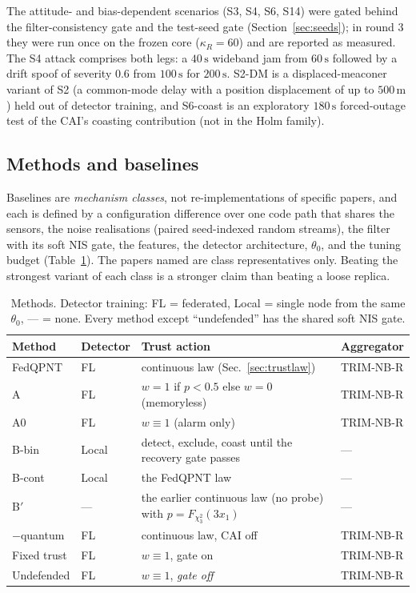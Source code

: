 \documentclass[journal]{IEEEtran}
\begin{document}
The attitude- and bias-dependent scenarios (S3, S4, S6, S14) were gated behind the filter-consistency gate and the
test-seed gate (Section~\ref{sec:seeds}); in round 3 they were run once on the frozen core ($\kappa_R = 60$) and
are reported as measured. The S4 attack comprises both legs: a $40\,\mathrm{s}$ wideband jam from $60\,\mathrm{s}$
followed by a drift spoof of severity $0.6$ from $100\,\mathrm{s}$ for $200\,\mathrm{s}$. S2-DM is a displaced-meaconer variant of S2
(a common-mode delay with a position displacement of up to $500\,\mathrm{m}$) held out of detector training, and S6-coast is an exploratory
$180\,\mathrm{s}$ forced-outage test of the CAI's coasting contribution (not in the Holm family).

\subsection{Methods and baselines}
\label{sec:methods}
Baselines are \emph{mechanism classes}, not re-implementations of specific papers, and each is defined by a
configuration difference over one code path that shares the sensors, the noise realisations (paired
seed-indexed random streams), the filter with its soft NIS gate, the features, the detector architecture,
$\theta_0$, and the tuning budget (Table~\ref{tab:methods}). The papers named are class representatives
only. Beating the strongest variant of each class is a stronger claim than beating a loose replica.

\begin{table}[t]
\centering
\caption{Methods. Detector training: FL = federated, Local = single node from the same $\theta_0$, --- = none.
Every method except ``undefended'' has the shared soft NIS gate.}
\label{tab:methods}
\footnotesize
\begin{tabular}{p{2.0cm}p{1.0cm}p{3.5cm}p{1.3cm}}
\toprule
Method & Detector & Trust action & Aggregator \\
\midrule
FedQPNT & FL & continuous law (Sec.~\ref{sec:trustlaw}) & TRIM-NB-R \\
A \cite{khan2025enhancing,chai2025navigation} & FL & $w{=}1$ if $p{<}0.5$ else $w{=}0$ (memoryless) & TRIM-NB-R \\
A0 & FL & $w{\equiv}1$ (alarm only) & TRIM-NB-R \\
B-bin \cite{pardhasaradhi2022gps} & Local & detect, exclude, coast until the recovery gate passes & --- \\
B-cont \cite{ren2020adaptive} & Local & the FedQPNT law & --- \\
B$'$ \cite{mehra1970identification} & --- & the earlier continuous law (no probe) with $p = F_{\chi^2_3}(3x_1)$ & --- \\
$-$quantum & FL & continuous law, CAI off & TRIM-NB-R \\
Fixed trust & FL & $w{\equiv}1$, gate on & TRIM-NB-R \\
Undefended & FL & $w{\equiv}1$, \emph{gate off} & TRIM-NB-R \\
\bottomrule
\end{tabular}
\end{table}
\end{document}
